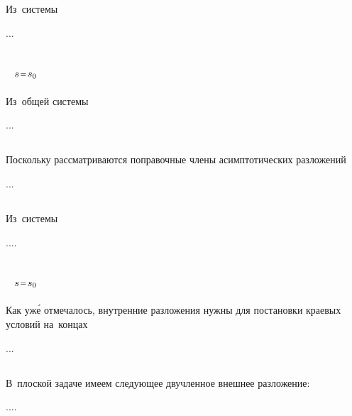 \begin{otherlanguage}{russian}

\subsection*{}

Из~системы

...

\subsection*{~${s \narroweq s_0}$}

Из~общей системы

...

\subsection*{}

Поскольку рассматриваются поправочные члены асимптотических разложений

...



\end{otherlanguage}



\begin{otherlanguage}{russian}

\subsection*{}

Из~системы

....

\subsection*{~${s \narroweq s_0}$}

Как уж\'{е} отмечалось, внутренние разложения нужны для постановки краевых условий на~концах

...

\subsection*{}

В~плоской задаче имеем следующее двучленное внешнее разложение:

....



\end{otherlanguage}

